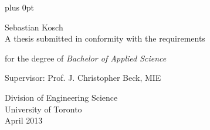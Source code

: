 \fontsize{12pt}{16pt}\selectfont
\thispagestyle{empty}
\pagestyle{fancy}

\baselineskip=16.8pt plus 0pt
\frenchspacing

\begin{centering}
\vspace{3em}
\LARGE{}

\vspace{2em}
\large
\sansfont Sebastian Kosch\\

\vfill
\normalfont
\fontsize{12pt}{16pt}\selectfont
A thesis submitted in conformity with the requirements

for the degree of \textit{Bachelor of Applied Science}

\vspace{1em}
Supervisor: Prof. J. Christopher Beck, MIE

\vspace{2em}

\textmd Division of Engineering Science\\
University of Toronto\\

April 2013

\end{centering}
\pagebreak
